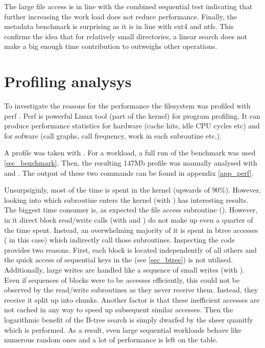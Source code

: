         The large file access is in line with the combined sequential test
        indicating that further increasing the work load does not reduce
        performance. Finally, the metadata benchmark is surprising as it is in
        line with ext4 and ntfs. This confirms the idea that for relatively
        small directories, a linear search does not make a big enough time
        contribution to outweighs other operations.

    \section{Profiling analysys}
        \label{sec_perf}

        To investigate the reasons for the performance the filesystem was
        profiled with perf \cite{perf}. Perf is powerful Linux tool (part of
        the kernel) for program profiling. It can produce performance
        statistics for hardware (cache hits, idle CPU cycles etc) and for
        sofware (call graphs, call frequency, work in each subroutine etc.).

        A profile was taken with . For a
        workload, a full run of the benchmark was used \ref{sec_benchmark}.
        Then, the resulting 147Mb profile was manually analysed with
         and . The output of these two commands can be found in
        appendix \ref{app_perf}.

        Unsurpsiginly, most of the time is spent in the kernel (upwards of
        90\%). However, looking into which subroutine enters the kernel (with
        ) has interesting results. The biggest time
        consumer is, as expected the file access subroutine
        (). However, in it direct block
        read/write calls (with  and
        ) do not make up even a quarter of the time
        spent. Instead, an overwhelming majority of it is spent in btree
        accesses ( in this case) which indirectly
        call those subroutines. Inspecting the code provides two reasons.
        First, each block is located independently of all others and the quick
        access of sequential keys in the \bplustree (see \ref{sec_btree}) is
        not utilised. Additionally, large writes are handled like a sequence of
        small writes (with ). Even if
        sequences of blocks were to be accesses efficiently, this could not be
        observed by the read/write subroutines as they never receive them.
        Instead, they receive it split up into chunks. Another factor is that
        these inefficient accesses are not cached in any way to speed up
        subsequent similar accesses. Then the logarithmic benefit of the B-tree
        search is simply dwarfed by the sheer quanitfy which is performed. As a
        result, even large sequential workloads behave like numerous random
        ones and a lot of performance is left on the table.

